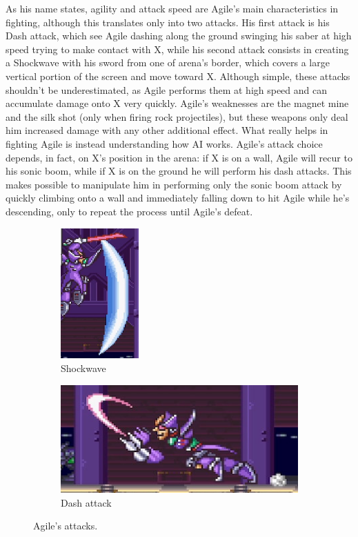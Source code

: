 As his name states, agility and attack speed are Agile's main characteristics in fighting, although this translates only into two attacks. His first attack is his Dash attack, which see Agile dashing along the ground swinging his saber at high speed trying to make contact with X, while his second attack consists in creating a Shockwave with his sword from one of arena's border, which covers a large vertical portion of the screen and move toward X. Although simple, these attacks shouldn't be underestimated, as Agile performs them at high speed and can accumulate damage onto X very quickly. Agile's weaknesses are the magnet mine and the silk shot (only when firing rock projectiles), but these weapons only deal him increased damage with any other additional effect. What really helps in fighting Agile is instead understanding how AI works. Agile's attack choice depends, in fact, on  X's position in the arena: if X is on a wall, Agile will recur to his sonic boom, while if X is on the ground he will perform his dash attacks. This makes possible to manipulate him in performing only the sonic boom attack by quickly climbing onto a wall and immediately falling down to hit Agile while he's descending, only to repeat the process until Agile's defeat.
\begin{figure}[htp]
	\centering
	\begin{subfigure}{0.3\linewidth}
		\centering
		\includegraphics[height=5cm]{figures/X2/Hunter_stages/Agile_crescent.png}
		\caption{Shockwave}	
	\end{subfigure}
	\begin{subfigure}{0.6\linewidth}
		\centering
		\includegraphics[width=\linewidth]{figures/X2/Hunter_stages/Agile_dash.png}
		\caption{Dash attack}
	\end{subfigure}
	
	\caption{Agile's attacks.}	
\end{figure}
